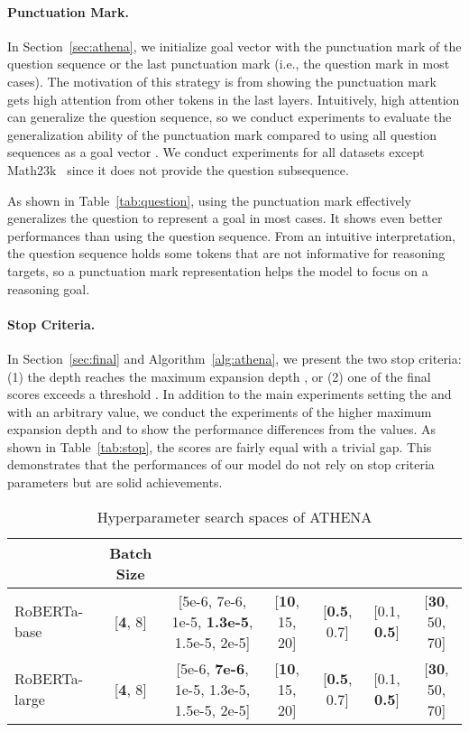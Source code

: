 \documentclass[11pt]{article}
\newcommand{\1}{\mathbb{1}}
\begin{document}
\paragraph{Punctuation Mark.}
In Section~\ref{sec:athena}, we initialize goal vector  with the punctuation mark of the question sequence or the last punctuation mark (i.e., the question mark in most cases).
The motivation of this strategy is from \citet{clark-etal-2019-bert} showing the punctuation mark gets high attention from other tokens in the last layers.
Intuitively, high attention can generalize the question sequence,
so we conduct experiments to evaluate the generalization ability of the punctuation mark compared to using all question sequences as a goal vector .
We conduct experiments for all datasets except Math23k~\citep{wang-etal-2017-deep} since it does not provide the question subsequence.


As shown in Table~\ref{tab:question}, using the punctuation mark effectively generalizes the question to represent a goal in most cases.
It shows even better performances than using the question sequence.
From an intuitive interpretation, the question sequence holds some tokens that are not informative for reasoning targets, so a punctuation mark representation helps the model to focus on a reasoning goal.


\paragraph{Stop Criteria.}
In Section~\ref{sec:final} and Algorithm~\ref{alg:athena}, we present the two stop criteria: (1) the depth reaches the maximum expansion depth , or (2) one of the final scores exceeds a threshold .
In addition to the main experiments setting the  and  with an arbitrary value,
we conduct the experiments of the higher maximum expansion depth and  to show the performance differences from the values.
As shown in Table~\ref{tab:stop}, the scores are fairly equal with a trivial gap.
This demonstrates that the performances of our model do not rely on stop criteria parameters but are solid achievements.



\begin{table*}
    \centering
    \setlength{\tabcolsep}{3pt}
    \small
    \begin{tabular}{lcccccc}
        \toprule
        & Batch Size &  &  &  &  &  \\
        \midrule
        RoBERTa-base & [\textbf{4}, 8]  & [5e-6, 7e-6, 1e-5, \textbf{1.3e-5}, 1.5e-5, 2e-5] & [\textbf{10}, 15, 20] & [\textbf{0.5}, 0.7] & [0.1, \textbf{0.5}] & [\textbf{30}, 50, 70] \\
        RoBERTa-large & [\textbf{4}, 8]  & [5e-6, \textbf{7e-6}, 1e-5, 1.3e-5, 1.5e-5, 2e-5] & [\textbf{10}, 15, 20] & [\textbf{0.5}, 0.7] & [0.1, \textbf{0.5}] & [\textbf{30}, 50, 70] \\
         \bottomrule
    \end{tabular}
    \caption{Hyperparameter search spaces of ATHENA}
    \label{tab:hyper}
\end{table*}
\end{document}
